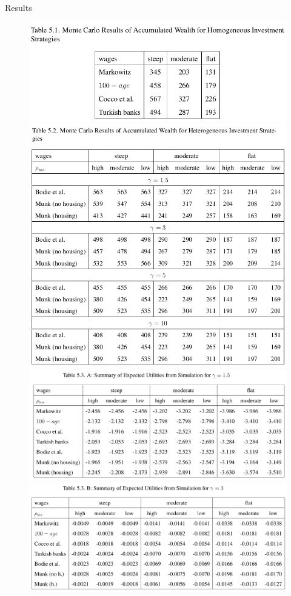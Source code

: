 \documentclass{beamer}
\begin{document}
\begin{frame}[allowframebreaks]{Results}
  \begin{itemize}
	\begin{figure}[H]
		\includegraphics[scale=0.4]{figs/montecarlo_hom.png}
		\includegraphics[scale=0.3]{figs/montecarlo_het.png}
		\includegraphics[scale=0.2]{figs/util15.png}
		\includegraphics[scale=0.2]{figs/util3.png}

\end{figure}
\end{itemize}
\end{frame}
\end{document}

